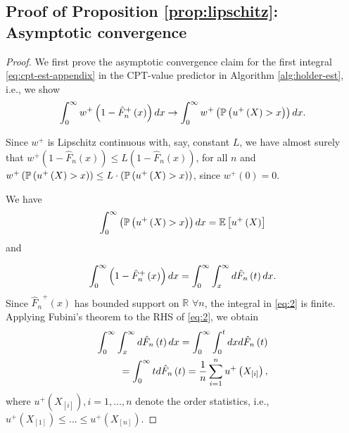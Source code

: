 \subsection*{Proof of Proposition \ref{prop:lipschitz}: Asymptotic convergence}
\begin{proof}
We first prove the asymptotic convergence claim for the first integral  \eqref{eq:cpt-est-appendix} in the CPT-value predictor in Algorithm \ref{alg:holder-est}, i.e., we show
\begin{align}
\int_0^{\infty} w^+\left(1-{\hat F_n}^+\left(x\right)\right)  dx \rightarrow \int_0^{\infty} w^+\left(\mathbb{P}\left( u^+\left(X\right)>x \right)\right) dx.\label{eq:3}
\end{align} 

Since $w^+$ is Lipschitz continuous with, say, constant $L$, we have almost surely that
$w^{+}\left(1-\hat{F}_n\left(x\right)\right) \leq L \left(1-\hat{F}_n\left(x\right)\right)$,  
for all $n$ and 
 $w^{+}\left(\mathbb{P}\left( u^+\left(X\right)>x \right)\right) \leq L\cdot \left(\mathbb{P}\left( u^+\left(X\right)>x \right)\right)$, since $w^+\left(0\right)=0$.
 

We have
$$\int_0^{\infty} \left(\mathbb{P}\left( u^+\left(X\right)>x \right)\right)  dx = \mathbb{E}\left[u^+\left(X\right)\right]$$
and

\begin{equation}
\int_0^{\infty} \left(1-{\hat F_n}^+\left(x\right)\right)  dx =\int_0^{\infty} \int_x^\infty d \hat{F}_n\left(t\right) dx.\label{eq:2}
\end{equation}
Since ${\hat F_n}^+\left(x\right)$ has bounded support on $\mathbb{R}$ $\forall n$, the integral in \eqref{eq:2} is finite.
Applying Fubini's theorem to the RHS of \eqref{eq:2}, we obtain
\begin{align*}
\int_0^{\infty} \int_x^\infty d \hat{F}_n\left(t\right) dx = \int_0^{\infty} \int_0^t dx d \hat{F}_n\left(t\right) \\
= \int_0^{\infty} t d\hat{F}_n\left(t\right) = \frac{1}{n} \sum_{i=1}^n u^+\left(X_{[i]}\right),
 \end{align*}
 where $u^+\left(X_{[i]}\right), i=1,\ldots,n$ denote the order statistics, i.e., $u^+\left(X_{[1]}\right) \le \ldots \le u^+\left(X_{[n]}\right)$.
 

\end{proof}
